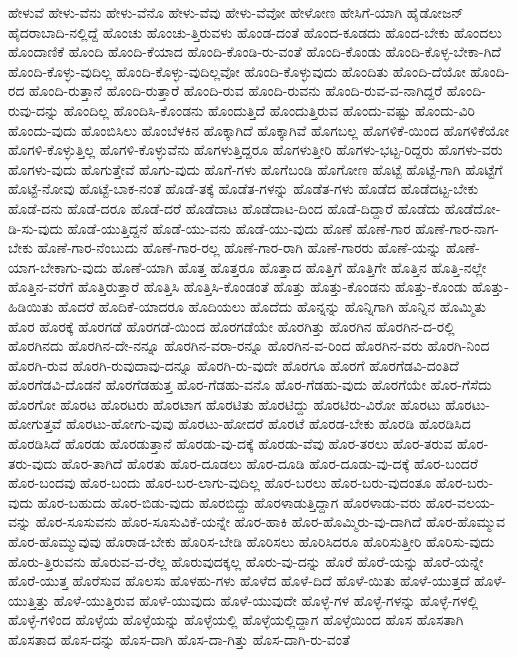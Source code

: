 {ಹೇಳುವೆ
ಹೇಳು-ವೆನು
ಹೇಳು-ವೆನೊ
ಹೇಳು-ವೆವು
ಹೇಳು-ವೆವೋ
ಹೇಳೋಣ
ಹೇಸಿಗೆ-ಯಾಗಿ
ಹೈಡೋಜನ್
ಹೈದರಾಬಾದಿ-ನಲ್ಲಿದ್ದೆ
ಹೊಂಚು
ಹೊಂಚು-ತ್ತಿರುವಳು
ಹೊಂಡ-ದಂತೆ
ಹೊಂದ-ಕೂಡದು
ಹೊಂದ-ಬೇಕು
ಹೊಂದಲು
ಹೊಂದಾಣಿಕೆ
ಹೊಂದಿ
ಹೊಂದಿ-ಕೆಯಾದ
ಹೊಂದಿ-ಕೊಂಡಿ-ರು-ವಂತೆ
ಹೊಂದಿ-ಕೊಂಡು
ಹೊಂದಿ-ಕೊಳ್ಳ-ಬೇಕಾ-ಗಿದೆ
ಹೊಂದಿ-ಕೊಳ್ಳು-ವುದಿಲ್ಲ
ಹೊಂದಿ-ಕೊಳ್ಳು-ವುದಿಲ್ಲವೋ
ಹೊಂದಿ-ಕೊಳ್ಳುವುದು
ಹೊಂದಿತು
ಹೊಂದಿ-ದೆಯೋ
ಹೊಂದಿ-ರದ
ಹೊಂದಿ-ರುತ್ತಾನೆ
ಹೊಂದಿ-ರುತ್ತಾರೆ
ಹೊಂದಿ-ರುವ
ಹೊಂದಿ-ರುವನು
ಹೊಂದಿ-ರುವ-ವ-ನಾಗಿದ್ದರೆ
ಹೊಂದಿ-ರುವು-ದನ್ನು
ಹೊಂದಿಲ್ಲ
ಹೊಂದಿಸಿ-ಕೊಂಡನು
ಹೊಂದುತ್ತಿದೆ
ಹೊಂದುತ್ತಿರುವ
ಹೊಂದು-ವಷ್ಟು
ಹೊಂದು-ವಿರಿ
ಹೊಂದು-ವುದು
ಹೊಂಬಿಸಿಲು
ಹೊಂಬೆಳಕಿನ
ಹೊಕ್ಕಾಗಿದೆ
ಹೊಕ್ಕಾಗಿವೆ
ಹೊಗಬಲ್ಲ
ಹೊಗಳಿಕೆ-ಯಿಂದ
ಹೊಗಳಿಕೆಯೋ
ಹೊಗಳಿ-ಕೊಳ್ಳುತ್ತಿಲ್ಲ
ಹೊಗಳಿ-ಕೊಳ್ಳುವೆನು
ಹೊಗಳುತ್ತಿದ್ದರೂ
ಹೊಗಳುತ್ತೀರಿ
ಹೊಗಳು-ಭಟ್ಟ-ರಿದ್ದರು
ಹೊಗಳು-ವರು
ಹೊಗಳು-ವುದು
ಹೊಗುತ್ತೇವೆ
ಹೊಗು-ವುದು
ಹೊಗೆ-ಗಳು
ಹೊಗೆಬಂಡಿ
ಹೊಗೋಣ
ಹೊಟ್ಟೆ
ಹೊಟ್ಟೆ-ಗಾಗಿ
ಹೊಟ್ಟೆಗೆ
ಹೊಟ್ಟೆ-ನೋವು
ಹೊಟ್ಟೆ-ಬಾಕ-ನಂತೆ
ಹೊಡೆ-ತಕ್ಕೆ
ಹೊಡೆತ-ಗಳನ್ನು
ಹೊಡೆತ-ಗಳು
ಹೊಡೆದ
ಹೊಡೆದಟ್ಟ-ಬೇಕು
ಹೊಡೆ-ದನು
ಹೊಡೆ-ದರೂ
ಹೊಡೆ-ದರೆ
ಹೊಡೆದಾಟ
ಹೊಡೆದಾಟ-ದಿಂದ
ಹೊಡೆ-ದಿದ್ದಾರೆ
ಹೊಡೆದು
ಹೊಡೆದೋ-ಡಿ-ಸು-ವುದು
ಹೊಡೆ-ಯುತ್ತಿದ್ದನೆ
ಹೊಡೆ-ಯು-ವನು
ಹೊಡೆ-ಯು-ವುದು
ಹೊಣೆ
ಹೊಣೆ-ಗಾರ
ಹೊಣೆ-ಗಾರ-ನಾಗ-ಬೇಕು
ಹೊಣೆ-ಗಾರ-ನೆಂಬುದು
ಹೊಣೆ-ಗಾರ-ರಲ್ಲ
ಹೊಣೆ-ಗಾರ-ರಾಗಿ
ಹೊಣೆ-ಗಾರರು
ಹೊಣೆ-ಯನ್ನು
ಹೊಣೆ-ಯಾಗ-ಬೇಕಾಗು-ವುದು
ಹೊಣೆ-ಯಾಗಿ
ಹೊತ್ತ
ಹೊತ್ತರೂ
ಹೊತ್ತಾದ
ಹೊತ್ತಿಗೆ
ಹೊತ್ತಿಗೇ
ಹೊತ್ತಿನ
ಹೊತ್ತಿ-ನಲ್ಲೇ
ಹೊತ್ತಿನ-ವರೆಗೆ
ಹೊತ್ತಿರುತ್ತಾರೆ
ಹೊತ್ತಿಸಿ
ಹೊತ್ತಿಸಿ-ಕೊಂಡಂತೆ
ಹೊತ್ತು
ಹೊತ್ತು-ಕೊಂಡನು
ಹೊತ್ತು-ಕೊಂಡು
ಹೊತ್ತು-ಹಿಡಿಯಿತು
ಹೊದರೆ
ಹೊದಿಕೆ-ಯಾದರೂ
ಹೊದಿಯಲು
ಹೊದೆದು
ಹೊನ್ನನ್ನು
ಹೊನ್ನಿಗಾಗಿ
ಹೊನ್ನಿನ
ಹೊಮ್ಮಿತು
ಹೊರ
ಹೊರಕ್ಕೆ
ಹೊರಗಡೆ
ಹೊರಗಡೆ-ಯಿಂದ
ಹೊರಗಡೆಯೇ
ಹೊರಗಿತ್ತು
ಹೊರಗಿನ
ಹೊರಗಿನ-ದ-ರಲ್ಲಿ
ಹೊರಗಿನದು
ಹೊರಗಿನ-ದೇ-ನನ್ನೂ
ಹೊರಗಿನ-ವರಾ-ರನ್ನೂ
ಹೊರಗಿನ-ವ-ರಿಂದ
ಹೊರಗಿನ-ವರು
ಹೊರಗಿ-ನಿಂದ
ಹೊರಗಿ-ರುವ
ಹೊರಗಿ-ರುವುದಾವು-ದನ್ನೂ
ಹೊರಗಿ-ರು-ವುದೇ
ಹೊರಗೂ
ಹೊರಗೆ
ಹೊರಗೆಡವಿ-ದಂತಿದೆ
ಹೊರಗೆಡವಿ-ದೊಡನೆ
ಹೊರಗೆಡಹುತ್ತ
ಹೊರ-ಗೆಡಹು-ವನೊ
ಹೊರ-ಗೆಡಹು-ವುದು
ಹೊರಗೆಯೇ
ಹೊರ-ಗೆಸೆದು
ಹೊರಗೋ
ಹೊರಟ
ಹೊರಟರು
ಹೊರಟಾಗ
ಹೊರಟಿತು
ಹೊರಟಿದ್ದು
ಹೊರಟಿರು-ವಿರೋ
ಹೊರಟು
ಹೊರಟು-ಹೋಗುತ್ತವೆ
ಹೊರಟು-ಹೋಗು-ವುವು
ಹೊರಟು-ಹೋದರೆ
ಹೊರಟೆ
ಹೊರಡ-ಬೇಕು
ಹೊರಡಿ
ಹೊರಡಿಸಿದ
ಹೊರಡಿಸಿದೆ
ಹೊರಡು
ಹೊರಡುತ್ತಾನೆ
ಹೊರಡು-ವು-ದಕ್ಕೆ
ಹೊರಡು-ವೆವು
ಹೊರ-ತರಲು
ಹೊರ-ತರುವ
ಹೊರ-ತರು-ವುದು
ಹೊರ-ತಾಗಿದೆ
ಹೊರತು
ಹೊರ-ದೂಡಲು
ಹೊರ-ದೂಡಿ
ಹೊರ-ದೂಡು-ವು-ದಕ್ಕೆ
ಹೊರ-ಬಂದರೆ
ಹೊರ-ಬಂದವು
ಹೊರ-ಬಂದು
ಹೊರ-ಬರ-ಲಾಗು-ವುದಿಲ್ಲ
ಹೊರ-ಬರಲು
ಹೊರ-ಬರು-ವುದಂತೂ
ಹೊರ-ಬರು-ವುದು
ಹೊರ-ಬಹುದು
ಹೊರ-ಬಿಡು-ವುದು
ಹೊರಬಿದ್ದು
ಹೊರಳಾಡುತ್ತಿದ್ದಾಗ
ಹೊರಳಾಡು-ವರು
ಹೊರ-ವಲಯ-ವನ್ನು
ಹೊರ-ಸೂಸುವನು
ಹೊರ-ಸೂಸುವಿಕೆ-ಯನ್ನೇ
ಹೊರ-ಹಾಕಿ
ಹೊರ-ಹೊಮ್ಮಿರು-ವು-ದಾಗಿದೆ
ಹೊರ-ಹೊಮ್ಮುವ
ಹೊರ-ಹೊಮ್ಮುವುವು
ಹೊರಾಡ-ಬೇಕು
ಹೊರಿಸ-ಬೇಡಿ
ಹೊರಿಸಲು
ಹೊರಿಸಿದರೂ
ಹೊರಿಸುತ್ತೀರಿ
ಹೊರಿಸು-ವುದು
ಹೊರು-ತ್ತಿರುವನು
ಹೊರುವ-ವ-ರೆಲ್ಲ
ಹೊರುವುದಕ್ಕಲ್ಲ
ಹೊರು-ವು-ದನ್ನು
ಹೊರೆ
ಹೊರೆ-ಯನ್ನು
ಹೊರೆ-ಯನ್ನೇ
ಹೊರೆ-ಯುತ್ತ
ಹೊರೆಸುವ
ಹೊಲಸು
ಹೊಳಹು-ಗಳು
ಹೊಳೆದ
ಹೊಳೆ-ದಿದೆ
ಹೊಳೆ-ಯಿತು
ಹೊಳೆ-ಯುತ್ತದೆ
ಹೊಳೆ-ಯುತ್ತಿತ್ತು
ಹೊಳೆ-ಯುತ್ತಿರುವ
ಹೊಳೆ-ಯುವುದು
ಹೊಳೆ-ಯುವುದೇ
ಹೊಳ್ಳೆ-ಗಳ
ಹೊಳ್ಳೆ-ಗಳನ್ನು
ಹೊಳ್ಳೆ-ಗಳಲ್ಲಿ
ಹೊಳ್ಳೆ-ಗಳಿಂದ
ಹೊಳ್ಳೆಯ
ಹೊಳ್ಳೆಯನ್ನು
ಹೊಳ್ಳೆಯಲ್ಲಿ
ಹೊಳ್ಳೆಯಲ್ಲಿದ್ದಾಗ
ಹೊಳ್ಳೆಯಿಂದ
ಹೊಸ
ಹೊಸತಾಗಿ
ಹೊಸತಾದ
ಹೊಸ-ದನ್ನು
ಹೊಸ-ದಾಗಿ
ಹೊಸ-ದಾ-ಗಿತ್ತು
ಹೊಸ-ದಾಗಿ-ರು-ವಂತೆ
}
